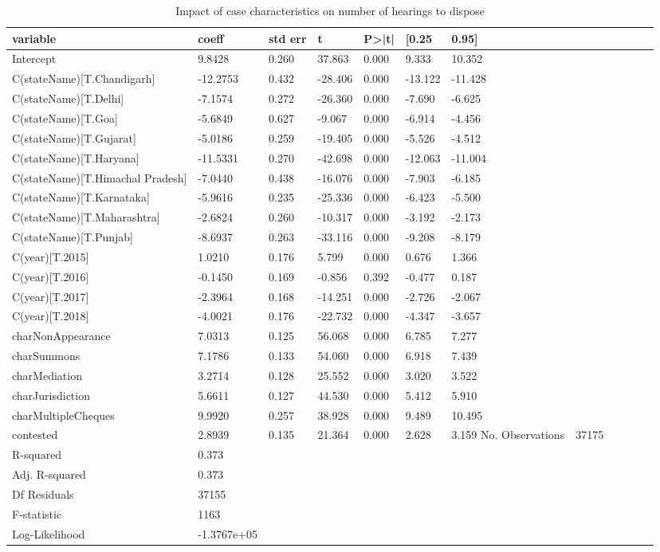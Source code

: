 \begin{longtable}{@{}lllllll@{}}
\caption{Impact of case characteristics on number of hearings to dispose}
\label{tab:hearings_reg}\\
\toprule
variable & coeff & std err & t & P>|t| & [0.25 & 0.95] \\\midrule
\endhead
%
Intercept & 9.8428 & 0.260 & 37.863 & 0.000 & 9.333 & 10.352 \\
C(stateName)[T.Chandigarh] & -12.2753 & 0.432 & -28.406 & 0.000 & -13.122 & -11.428 \\
C(stateName)[T.Delhi] & -7.1574 & 0.272 & -26.360 & 0.000 & -7.690 & -6.625 \\
C(stateName)[T.Goa] & -5.6849 & 0.627 & -9.067 & 0.000 & -6.914 & -4.456 \\
C(stateName)[T.Gujarat] & -5.0186 & 0.259 & -19.405 & 0.000 & -5.526 & -4.512 \\
C(stateName)[T.Haryana] & -11.5331 & 0.270 & -42.698 & 0.000 & -12.063 & -11.004 \\
C(stateName)[T.Himachal Pradesh] & -7.0440 & 0.438 & -16.076 & 0.000 & -7.903 & -6.185 \\
C(stateName)[T.Karnataka] & -5.9616 & 0.235 & -25.336 & 0.000 & -6.423 & -5.500 \\
C(stateName)[T.Maharashtra] & -2.6824 & 0.260 & -10.317 & 0.000 & -3.192 & -2.173 \\
C(stateName)[T.Punjab] & -8.6937 & 0.263 & -33.116 & 0.000 & -9.208 & -8.179 \\
C(year)[T.2015] & 1.0210 & 0.176 & 5.799 & 0.000 & 0.676 & 1.366 \\
C(year)[T.2016] & -0.1450 & 0.169 & -0.856 & 0.392 & -0.477 & 0.187 \\
C(year)[T.2017] & -2.3964 & 0.168 & -14.251 & 0.000 & -2.726 & -2.067 \\
C(year)[T.2018] & -4.0021 & 0.176 & -22.732 & 0.000 & -4.347 & -3.657 \\
charNonAppearance & 7.0313 & 0.125 & 56.068 & 0.000 & 6.785 & 7.277 \\
charSummons & 7.1786 & 0.133 & 54.060 & 0.000 & 6.918 & 7.439 \\
charMediation & 3.2714 & 0.128 & 25.552 & 0.000 & 3.020 & 3.522 \\
charJurisdiction & 5.6611 & 0.127 & 44.530 & 0.000 & 5.412 & 5.910 \\
charMultipleCheques & 9.9920 & 0.257 & 38.928 & 0.000 & 9.489 & 10.495 \\
contested & 2.8939 & 0.135 & 21.364 & 0.000 & 2.628 & 3.159
\bottomrule
No. Observations & 37175 & & & & &\\
R-squared & 0.373 & & & & & \\
Adj. R-squared& 0.373& & & & & \\
Df Residuals& 37155 & & & & &\\
F-statistic & 1163 & & & & & \\
Log-Likelihood & -1.3767e+05 & & & & & \\
\bottomrule
\end{longtable}

